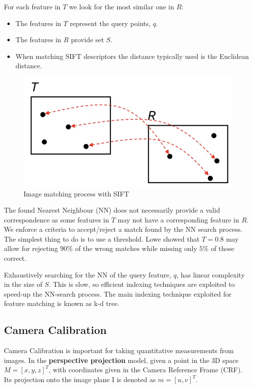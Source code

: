 \documentclass{article}
\begin{document}
For each feature in $T$ we look for the most similar one in $R$:
\begin{itemize}
  \item The features in $T$ represent the query points, $q$.
  \item The features in $R$ provide set $S$.
  \item When matching SIFT descriptors the distance typically used is the Euclidean distance.
\end{itemize}

\begin{figure}[htbp]
  \centering
  \includegraphics[width=0.7\linewidth]{./img/matching_sift.jpg}
  \caption{Image matching process with SIFT}
  \label{fig:matching_sift}
\end{figure}

The found Nearest Neighbour (NN) does not necessarily provide a valid correspondence as some features in $T$ may not have a corresponding feature in $R$.
We enforce a criteria to accept/reject a match found by the NN search process.
The simplest thing to do is to use a threshold.
Lowe showed that $T=0.8$ may allow for rejecting $90\%$ of the wrong matches while missing only $5\%$ of those correct.

Exhaustively searching for the NN of the query feature, $q$, has linear complexity in the size of $S$.
This is slow, so efficient indexing techniques are exploited to speed-up the NN-search process.
The main indexing technique exploited for feature matching is known as k-d tree.

\subsection{Camera Calibration}

Camera Calibration is important for taking quantitative measurements from images.
In the \textbf{perspective projection} model, given a point in the 3D space $M = [x,y,z]^T$, with coordinates given in the Camera Reference Frame (CRF).
Its projection onto the image plane I is denoted as $m=[u,v]^T$.
\end{document}
